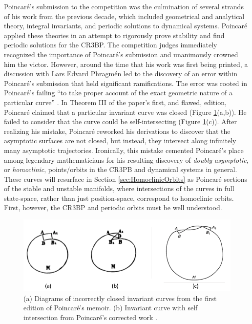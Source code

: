 \documentclass[11pt]{article} %
\begin{document}
Poincaré's submission to the competition was the culmination of several strands of his work from the previous decade, which included geometrical and analytical theory, integral invariants, and periodic solutions to dynamical systems. Poincaré applied these theories in an attempt to rigorously prove stability and find periodic solutions for the CR3BP. The competition judges immediately recognized the importance of Poincaré's submission and unanimously crowned him the victor. However, around the time that his work was first being printed, a discussion with Lars Edvard Phragmén led to the discovery of an error within Poincaré's submission that held significant ramifications. The error was rooted in Poincaré's failing ``to take proper account of the exact geometric nature of a particular curve'' \cite{BarrowGreen1997}. In Theorem III of the paper's first, and flawed, edition, Poincaré claimed that a particular invariant curve was closed (Figure \ref{fig:curveIntersection1}(a,b)). He failed to consider that the curve could be self-intersecting (Figure \ref{fig:curveIntersection1}(c)). After realizing his mistake, Poincaré reworked his derivations to discover that the asymptotic surfaces are not closed, but instead, they intersect along infinitely many asymptotic trajectories. Ironically, this mistake cemented Poincaré's place among legendary mathematicians for his resulting discovery of \textit{doubly asymptotic}, or \textit{homoclinic}, points/orbits in the CR3PB and dynamical systems in general. These curves will resurface in Section \ref{sec:HomoclinicOrbits} as Poincaré sections of the stable and unstable manifolds, where intersections of the curves in full state-space, rather than just position-space, correspond to homoclinic orbits. First, however, the CR3BP and periodic orbits must be well understood.

\begin{figure}[H]
\centering
\includegraphics[width=5in]{curveIntersection1.png}\nonumber{}
\caption{(a) Diagrams of incorrectly closed invariant curves from the first edition of Poincaré's memoir. (b) Invariant curve with self intersection from Poincaré's corrected work \cite{BarrowGreen1997}.}
\label{fig:curveIntersection1}
\end{figure}
\end{document}
